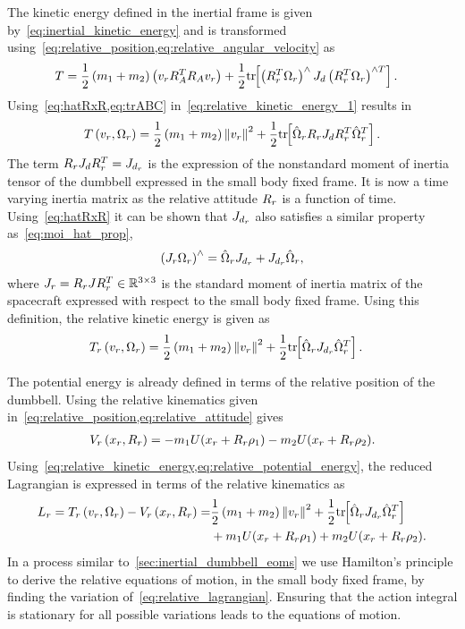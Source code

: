 The kinetic energy defined in the inertial frame is given by~\cref{eq:inertial_kinetic_energy} and is transformed using~\cref{eq:relative_position,eq:relative_angular_velocity} as
\begin{align}\label{eq:relative_kinetic_energy_1}
    T &= \frac{1}{2} \left( m_1 + m_2 \right) \left( v_r R_A^T R_A v_r \right) + \frac{1}{2} \mathrm{tr}\negthickspace\left[ \left( R_r^T \Omega_r \right)^\wedge J_d \left( R_r^T \Omega_r  \right)^{\wedge T} \right]. 
\end{align}
Using~\cref{eq:hatRxR,eq:trABC} in~\cref{eq:relative_kinetic_energy_1} results in
\begin{align}\label{eq:relative_kinetic_energy_2}
    T\left( v_r, \Omega_r \right) = \frac{1}{2} \left( m_1 + m_2 \right) \left\| v_r \right\|^2 + \frac{1}{2} \mathrm{tr}\negthickspace\left[ \hat{\Omega}_r R_r J_d R_r^T \hat{\Omega}_r^T \right].
\end{align}
The term \( R_r J_d R_r^T = J_{d_r}\) is the expression of the nonstandard moment of inertia tensor of the dumbbell expressed in the small body fixed frame. 
It is now a time varying inertia matrix as the relative attitude \( R_r \) is a function of time.
Using~\cref{eq:hatRxR} it can be shown that \( J_{d_r} \) also satisfies a similar property as~\cref{eq:moi_hat_prop}, 
\begin{align}\label{eq:moi_relative_hat_prop}
    \left( J_r \Omega_r \right)^\wedge = \hat{\Omega}_r J_{d_r} + J_{d_r}\hat{\Omega}_r,
\end{align}
where \( J_r = R_r J R_r^T \in \mathbb{R}^{3 \times 3}\) is the standard moment of inertia matrix of the spacecraft expressed with respect to the small body fixed frame.
Using this definition, the relative kinetic energy is given as
\begin{align}\label{eq:relative_kinetic_energy}
    T_r\left( v_r, \Omega_r \right) &= \frac{1}{2} \left( m_1 + m_2 \right) \left\| v_r \right\|^2 + \frac{1}{2} \mathrm{tr}\negthickspace\left[ \hat{\Omega}_r J_{d_r} \hat{\Omega}_r^T \right].
\end{align}

The potential energy is already defined in terms of the relative position of the dumbbell.
Using the relative kinematics given in~\cref{eq:relative_position,eq:relative_attitude} gives
\begin{align}\label{eq:relative_potential_energy}
    V_r\left( x_r, R_r \right) = -m_1 U( x_r + R_r \rho_1) - m_2 U(x_r + R_r \rho_2).
\end{align}
Using~\cref{eq:relative_kinetic_energy,eq:relative_potential_energy}, the reduced Lagrangian is expressed in terms of the relative kinematics as 
\begin{align}\label{eq:relative_lagrangian}
    L_r = T_r\left( v_r, \Omega_r \right) - V_r\left( x_r, R_r \right) =& \frac{1}{2} \left( m_1 + m_2 \right) \left\| v_r \right\|^2 + \frac{1}{2} \mathrm{tr}\negthickspace\left[ \hat{\Omega}_r J_{d_r} \hat{\Omega}_r^T \right] \nonumber \\
             &+m_1 U(x_r + R_r \rho_1) + m_2 U(x_r + R_r \rho_2) .
\end{align}
In a process similar to~\cref{sec:inertial_dumbbell_eoms} we use Hamilton's principle to derive the relative equations of motion, in the small body fixed frame, by finding the variation of~\cref{eq:relative_lagrangian}.
Ensuring that the action integral is stationary for all possible variations leads to the equations of motion.

